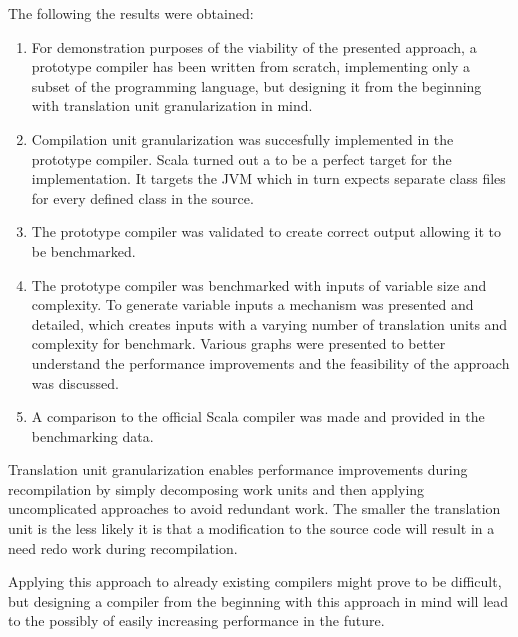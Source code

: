 \documentclass{VUMIFPSbakalaurinis}
\begin{document}
The following the results were obtained:

\begin{enumerate}
\item{
  For demonstration purposes of the viability of the presented approach, a prototype compiler has been written from scratch, implementing only a subset of the programming language, but designing it from the beginning with translation unit granularization in mind.
}
\item{
  Compilation unit granularization was succesfully implemented in the prototype compiler.
	Scala turned out a to be a perfect target for the implementation.
	It targets the JVM which in turn expects separate class files for every defined class in the source.
}
\item{
  The prototype compiler was validated to create correct output allowing it to be benchmarked.
}
\item{
  The prototype compiler was benchmarked with inputs of variable size and complexity.
  To generate variable inputs a mechanism was presented and detailed, which creates inputs with a varying number of translation units and complexity for benchmark.
  Various graphs were presented to better understand the performance improvements and the feasibility of the approach was discussed.
}
\item{
  A comparison to the official Scala compiler was made and provided in the benchmarking data.
}


\end{enumerate}

\iffalse
{}

Translation unit granularization enables performance improvements during recompilation by simply decomposing work units and then applying uncomplicated approaches to avoid redundant work.
The smaller the translation unit is the less likely it is that a modification to the source code will result in a need redo work during recompilation.

Applying this approach to already existing compilers might prove to be difficult, but designing a compiler from the beginning with this approach in mind will lead to the possibly of easily increasing performance in the future.
\end{document}
